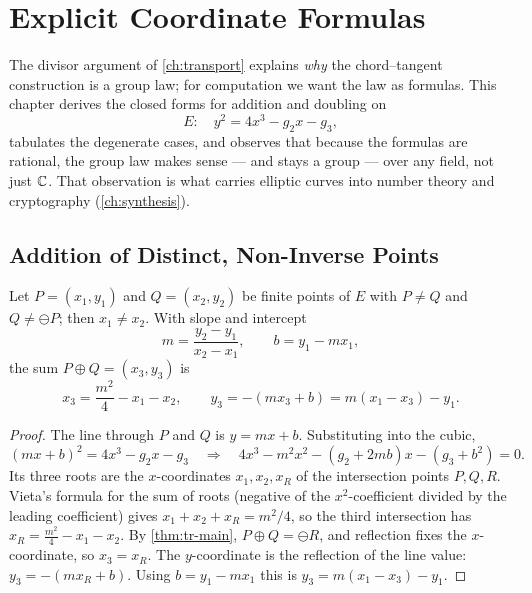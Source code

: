 \chapter{Explicit Coordinate Formulas}
\label{ch:coordinate_formulas}

The divisor argument of \cref{ch:transport} explains \emph{why} the
chord--tangent construction is a group law; for computation we want the law as
formulas. This chapter derives the closed forms for addition and doubling on
\[
  E : \quad y^2 = 4x^3 - g_2 x - g_3,
\]
tabulates the degenerate cases, and observes that because the formulas are
rational, the group law makes sense --- and stays a group --- over any field, not
just \(\mathbb{C}\). That observation is what carries elliptic curves into number theory
and cryptography (\cref{ch:synthesis}).

\section{Addition of Distinct, Non-Inverse Points}
\label{sec:coord-add}

\begin{theorem}
\label{thm:coord-add}
Let \(P = (x_1, y_1)\) and \(Q = (x_2, y_2)\) be finite points of \(E\) with
\(P \ne Q\) and \(Q \ne \ominus P\); then \(x_1 \ne x_2\). With slope and
intercept
\[
  m = \frac{y_2 - y_1}{x_2 - x_1}, \qquad b = y_1 - m x_1,
\]
the sum \(P \oplus Q = (x_3, y_3)\) is
\[
  \boxed{\,x_3 = \frac{m^2}{4} - x_1 - x_2, \qquad
  y_3 = -(m x_3 + b) = m(x_1 - x_3) - y_1 .\,}
\]
\end{theorem}

\begin{proof}
The line through \(P\) and \(Q\) is \(y = mx + b\). Substituting into the cubic,
\[
  (mx + b)^2 = 4x^3 - g_2 x - g_3
  \quad\Longrightarrow\quad
  4x^3 - m^2 x^2 - (g_2 + 2mb)x - (g_3 + b^2) = 0 .
\]
Its three roots are the \(x\)-coordinates \(x_1, x_2, x_R\) of the intersection
points \(P, Q, R\). Vieta's formula for the sum of roots (negative of the
\(x^2\)-coefficient divided by the leading coefficient) gives
\(x_1 + x_2 + x_R = m^2/4\), so the third intersection has
\(x_R = \tfrac{m^2}{4} - x_1 - x_2\). By \cref{thm:tr-main},
\(P \oplus Q = \ominus R\), and reflection fixes the \(x\)-coordinate, so
\(x_3 = x_R\). The \(y\)-coordinate is the reflection of the line value:
\(y_3 = -(m x_R + b)\). Using \(b = y_1 - m x_1\) this is
\(y_3 = m(x_1 - x_3) - y_1\).
\end{proof}

